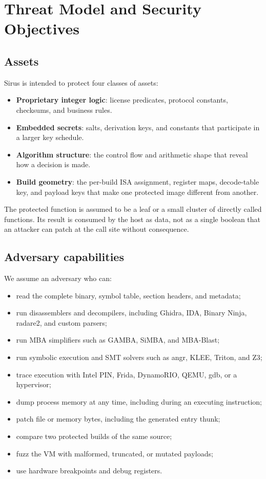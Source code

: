 \section{Threat Model and Security Objectives}
\label{sec:threat}

\subsection{Assets}

Sirus is intended to protect four classes of assets:

\begin{itemize}
  \item \textbf{Proprietary integer logic}: license predicates, protocol
        constants, checksums, and business rules.
  \item \textbf{Embedded secrets}: salts, derivation keys, and constants that
        participate in a larger key schedule.
  \item \textbf{Algorithm structure}: the control flow and arithmetic shape that
        reveal how a decision is made.
  \item \textbf{Build geometry}: the per-build ISA assignment, register maps,
        decode-table key, and payload keys that make one protected image
        different from another.
\end{itemize}

The protected function is assumed to be a leaf or a small cluster of directly
called functions. Its result is consumed by the host as data, not as a single
boolean that an attacker can patch at the call site without consequence.

\subsection{Adversary capabilities}

We assume an adversary who can:

\begin{itemize}
  \item read the complete binary, symbol table, section headers, and metadata;
  \item run disassemblers and decompilers, including Ghidra, IDA, Binary Ninja,
        radare2, and custom parsers;
  \item run MBA simplifiers such as GAMBA, SiMBA, and MBA-Blast;
  \item run symbolic execution and SMT solvers such as angr, KLEE, Triton, and
        Z3;
  \item trace execution with Intel PIN, Frida, DynamoRIO, QEMU, gdb, or a
        hypervisor;
  \item dump process memory at any time, including during an executing
        instruction;
  \item patch file or memory bytes, including the generated entry thunk;
  \item compare two protected builds of the same source;
  \item fuzz the VM with malformed, truncated, or mutated payloads;
  \item use hardware breakpoints and debug registers.
\end{itemize}

